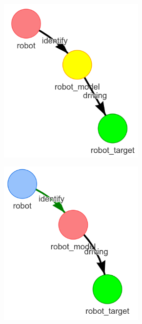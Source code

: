 \begin{figure}[H]
    \centering
    \begin{subfigure}{.3\textwidth}
    \centering
    \includegraphics[width=0.8\textwidth]{figures/connecting_nodes/robot_to_target/execute_robot_to_target_1}
    \end{subfigure}
    \begin{subfigure}{.3\textwidth}
    \centering
    \includegraphics[width=0.8\textwidth]{figures/connecting_nodes/robot_to_target/execute_robot_to_target_2}

\end{subfigure}
\end{figure}
